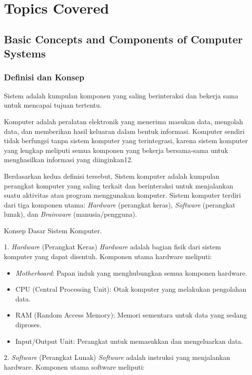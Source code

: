\documentclass[12pt]{article}
\begin{document}
\section{Topics Covered}

\subsection{Basic Concepts and Components of Computer Systems}
    \subsubsection{Definisi dan Konsep}
    \hspace*{1cm}Sistem adalah kumpulan komponen yang saling berinteraksi dan bekerja sama untuk mencapai tujuan tertentu.
    
    Komputer adalah peralatan elektronik yang menerima masukan data, mengolah data, dan memberikan hasil keluaran dalam bentuk informasi. Komputer sendiri tidak berfungsi tanpa sistem komputer yang terintegrasi, karena sistem komputer yang lengkap meliputi semua komponen yang bekerja bersama-sama untuk menghasilkan informasi yang diinginkan12.
    
    Berdasarkan kedua definisi tersebut, Sistem komputer adalah kumpulan perangkat komputer yang saling terkait dan berinteraksi untuk menjalankan suatu aktivitas atau program menggunakan komputer. Sistem komputer terdiri dari tiga komponen utama: \textit {Hardware} (perangkat keras), \textit{Software} (perangkat lunak), dan \textit{Brainware} (manusia/pengguna).
    
Konsep Dasar Sistem Komputer.

1. \textit {Hardware} (Perangkat Keras)
\textit {Hardware} adalah bagian fisik dari sistem komputer yang dapat disentuh. Komponen utama hardware meliputi:
\begin{itemize}
    \item \textit{Motherboard}: Papan induk yang menghubungkan semua komponen hardware.
    \item CPU (Central Processing Unit): Otak komputer yang melakukan pengolahan data.
    \item RAM (Random Access Memory): Memori sementara untuk data yang sedang diproses.
    \item Input/Output Unit: Perangkat untuk memasukkan dan mengeluarkan data.
\end{itemize}

2. \textit{Software} (Perangkat Lunak)
\textit{Software} adalah instruksi yang menjalankan hardware. Komponen utama software meliputi:
\end{document}
